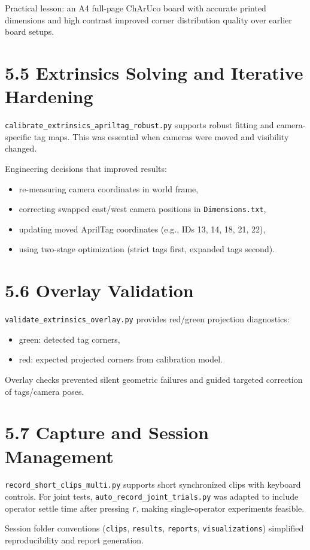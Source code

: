 Practical lesson: an A4 full-page ChArUco board with accurate printed dimensions and high contrast improved corner distribution quality over earlier board setups.

\section{5.5 Extrinsics Solving and Iterative Hardening}
\texttt{calibrate\_extrinsics\_apriltag\_robust.py} supports robust fitting and camera-specific tag maps. This was essential when cameras were moved and visibility changed.

Engineering decisions that improved results:
\begin{itemize}
  \item re-measuring camera coordinates in world frame,
  \item correcting swapped east/west camera positions in \texttt{Dimensions.txt},
  \item updating moved AprilTag coordinates (e.g., IDs 13, 14, 18, 21, 22),
  \item using two-stage optimization (strict tags first, expanded tags second).
\end{itemize}

\section{5.6 Overlay Validation}
\texttt{validate\_extrinsics\_overlay.py} provides red/green projection diagnostics:
\begin{itemize}
  \item green: detected tag corners,
  \item red: expected projected corners from calibration model.
\end{itemize}

Overlay checks prevented silent geometric failures and guided targeted correction of tags/camera poses.

\section{5.7 Capture and Session Management}
\texttt{record\_short\_clips\_multi.py} supports short synchronized clips with keyboard controls. For joint tests, \texttt{auto\_record\_joint\_trials.py} was adapted to include operator settle time after pressing \texttt{r}, making single-operator experiments feasible.

Session folder conventions (\texttt{clips}, \texttt{results}, \texttt{reports}, \texttt{visualizations}) simplified reproducibility and report generation.

